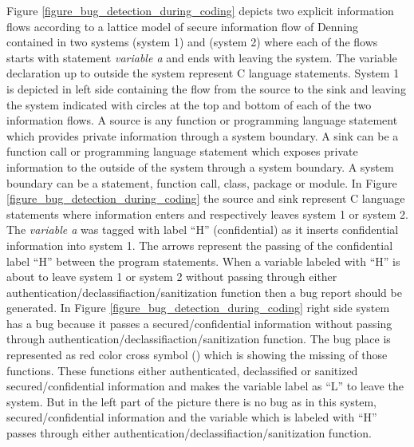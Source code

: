 Figure \ref{figure_bug_detection_during_coding} depicts two explicit information flows according to a lattice model of secure information flow of Denning \cite{ref_14_denning1976lattice} contained in two systems (system 1) and (system 2)
where each of the flows starts with statement \emph{variable a} and ends with leaving the system. The variable declaration up to outside the system represent C language statements. System 1 is depicted in left side containing the flow from the source to the sink and leaving the system indicated with circles at the top and bottom of each of the
two information flows. A source is any function or programming language statement which provides private information through a system boundary. A sink can be a function call or programming language statement which exposes private information to the outside of the system through a system boundary. A system boundary can be a statement, function call, class, package or module. In Figure \ref{figure_bug_detection_during_coding} the source and sink represent C language statements where information enters and respectively leaves system 1 or system 2. The \emph{ variable a} was tagged with label \enquote{H} (confidential) as it inserts confidential information into system 1. The arrows represent the passing of the confidential label \enquote{H} between the program statements. When a variable labeled with \enquote{H} is about to leave system 1 or system 2 without passing through either authentication/declassifiaction/sanitization function then a bug report should be generated. In Figure \ref{figure_bug_detection_during_coding} right side system has a bug because it passes a secured/confidential information without passing through authentication/declassifiaction/sanitization function. The bug place is represented as red color cross symbol () which is showing the missing of those functions. These functions either authenticated, declassified or sanitized  secured/confidential information and makes the variable label as \enquote{L} to leave the system. But in the left part of the picture there is no bug as in this system, secured/confidential information and the variable which is labeled with \enquote{H} passes through either authentication/declassifiaction/sanitization function.

